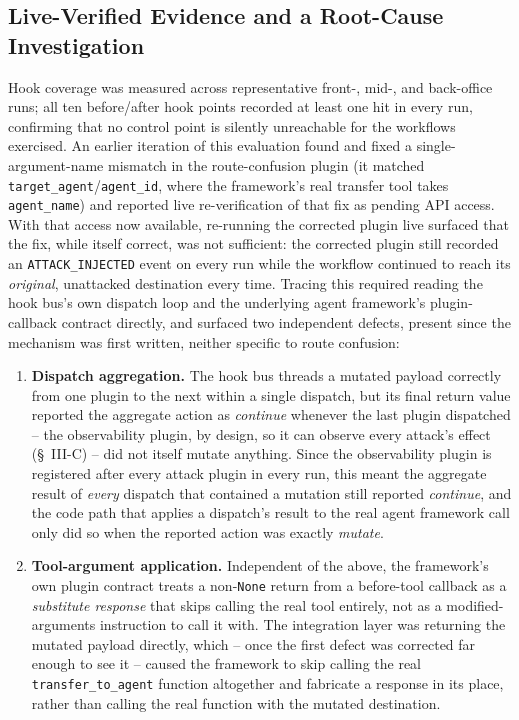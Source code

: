 \documentclass[conference]{IEEEtran}
\begin{document}
\subsection{Live-Verified Evidence and a Root-Cause Investigation}
\label{sec:live-evidence}
Hook coverage was measured across representative front-, mid-, and back-office runs; all ten before/after hook points recorded at least one hit in every run, confirming that no control point is silently unreachable for the workflows exercised. An earlier iteration of this evaluation found and fixed a single-argument-name mismatch in the route-confusion plugin (it matched \texttt{target\_agent}/\texttt{agent\_id}, where the framework's real transfer tool takes \texttt{agent\_name}) and reported live re-verification of that fix as pending API access. With that access now available, re-running the corrected plugin live surfaced that the fix, while itself correct, was not sufficient: the corrected plugin still recorded an \texttt{ATTACK\_INJECTED} event on every run while the workflow continued to reach its \emph{original}, unattacked destination every time. Tracing this required reading the hook bus's own dispatch loop and the underlying agent framework's plugin-callback contract directly, and surfaced two independent defects, present since the mechanism was first written, neither specific to route confusion:

\begin{enumerate}
    \item \textbf{Dispatch aggregation.} The hook bus threads a mutated payload correctly from one plugin to the next within a single dispatch, but its final return value reported the aggregate action as \emph{continue} whenever the last plugin dispatched -- the observability plugin, by design, so it can observe every attack's effect (\S~III-C) -- did not itself mutate anything. Since the observability plugin is registered after every attack plugin in every run, this meant the aggregate result of \emph{every} dispatch that contained a mutation still reported \emph{continue}, and the code path that applies a dispatch's result to the real agent framework call only did so when the reported action was exactly \emph{mutate}.
    \item \textbf{Tool-argument application.} Independent of the above, the framework's own plugin contract treats a non-\texttt{None} return from a before-tool callback as a \emph{substitute response} that skips calling the real tool entirely, not as a modified-arguments instruction to call it with. The integration layer was returning the mutated payload directly, which -- once the first defect was corrected far enough to see it -- caused the framework to skip calling the real \texttt{transfer\_to\_agent} function altogether and fabricate a response in its place, rather than calling the real function with the mutated destination.
\end{enumerate}
\end{document}
